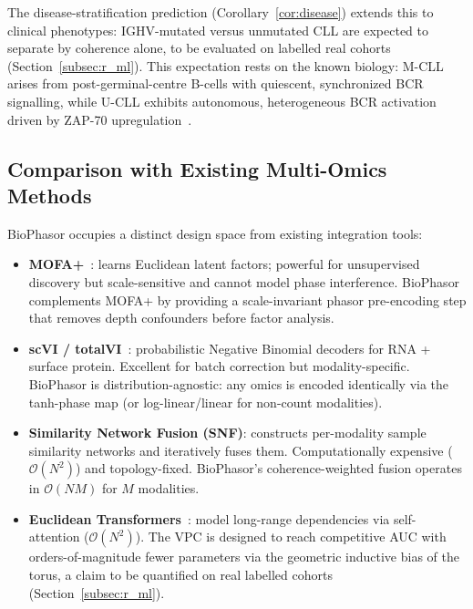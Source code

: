 \documentclass[preprint,12pt,amsmath,amssymb,superscriptaddress,floatfix]{revtex4-2}
\begin{document}
The disease-stratification prediction (Corollary~\ref{cor:disease}) extends
this to clinical phenotypes: IGHV-mutated versus unmutated CLL are expected to
separate by coherence alone, to be evaluated on labelled real cohorts
(Section~\ref{subsec:r_ml}).
This expectation rests on the known biology: M-CLL arises from
post-germinal-centre B-cells with quiescent, synchronized BCR signalling,
while U-CLL exhibits autonomous, heterogeneous BCR activation driven by
ZAP-70 upregulation~\cite{ref_121,ref_122}.

\subsection{Comparison with Existing Multi-Omics Methods}

BioPhasor occupies a distinct design space from existing integration tools:

\begin{itemize}
    \item \textbf{MOFA+}~\cite{ref_126,ref_127}: learns Euclidean latent
    factors; powerful for unsupervised discovery but scale-sensitive and
    cannot model phase interference.
    BioPhasor complements MOFA+ by providing a scale-invariant phasor
    pre-encoding step that removes depth confounders before factor analysis.

    \item \textbf{scVI / totalVI}~\cite{ref_128,ref_129}: probabilistic
    Negative Binomial decoders for RNA + surface protein.
    Excellent for batch correction but modality-specific.
    BioPhasor is distribution-agnostic: any omics is encoded identically
    via the tanh-phase map (or log-linear/linear for non-count modalities).

    \item \textbf{Similarity Network Fusion (SNF)}: constructs
    per-modality sample similarity networks and iteratively fuses them.
    Computationally expensive ($\mathcal{O}(N^2)$) and topology-fixed.
    BioPhasor's coherence-weighted fusion operates in $\mathcal{O}(NM)$
    for $M$ modalities.

    \item \textbf{Euclidean Transformers}~\cite{vaswani2017attention}:
    model long-range dependencies via self-attention
    ($\mathcal{O}(N^2)$).
    The VPC is designed to reach competitive AUC with orders-of-magnitude
    fewer parameters via the geometric inductive bias of the torus, a claim
    to be quantified on real labelled cohorts (Section~\ref{subsec:r_ml}).
\end{itemize}
\end{document}
